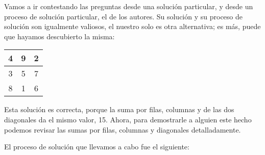 Vamos a ir contestando las preguntas desde una solución particular,
y desde un proceso de solución particular, el de los autores. Su solución y su 
proceso de solución son igualmente valiosos, el nuestro solo es otra 
alternativa; es más, puede que hayamos descubierto la misma:

\begin{center}
	\begin{tabular}{|c|c|c|}
		\hline 
		4 & 9 & 2\tabularnewline
		\hline
		3 & 5 & 7\tabularnewline
		\hline 
		8 & 1 & 6 \tabularnewline
		\hline
	\end{tabular}
\end{center}

Esta solución es correcta, porque la suma por filas, columnas y de
las dos diagonales da el mismo valor, 15. Ahora, para demostrarle
a alguien este hecho podemos revisar las sumas por filas, columnas y 
diagonales detalladamente.

% 

El proceso de solución que llevamos a cabo fue el siguiente:


